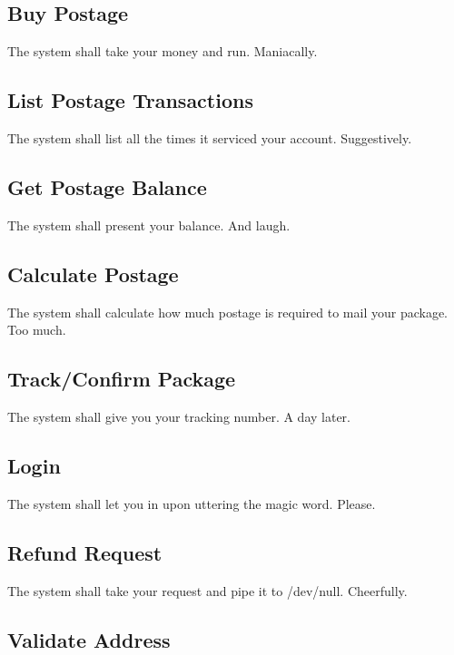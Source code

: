 \documentclass{scrreprt}
\begin{document}
\subsection{Buy Postage}

The system shall take your money and run. Maniacally.

\subsection{List Postage Transactions}

The system shall list all the times it serviced your account. Suggestively.

\subsection{Get Postage Balance}

The system shall present your balance. And laugh.

\subsection{Calculate Postage}

The system shall calculate how much postage is required to mail your package. 
Too much.

\subsection{Track/Confirm Package}

The system shall give you your tracking number. A day later.

\subsection{Login}

The system shall let you in upon uttering the magic word. Please.

\subsection{Refund Request}

The system shall take your request and pipe it to /dev/null. Cheerfully.

\subsection{Validate Address}
\end{document}
